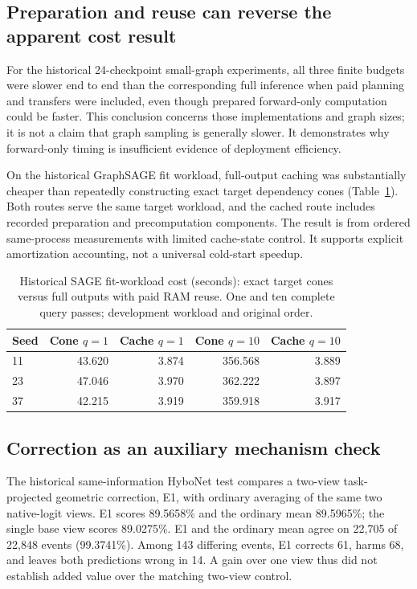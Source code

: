 \subsection{Preparation and reuse can reverse the apparent cost result}
For the historical 24-checkpoint small-graph experiments, all three finite budgets were slower end to end than the corresponding full inference when paid planning and transfers were included, even though prepared forward-only computation could be faster. This conclusion concerns those implementations and graph sizes; it is not a claim that graph sampling is generally slower. It demonstrates why forward-only timing is insufficient evidence of deployment efficiency.

On the historical GraphSAGE fit workload, full-output caching was substantially cheaper than repeatedly constructing exact target dependency cones (Table~\ref{tab:cache}). Both routes serve the same target workload, and the cached route includes recorded preparation and precomputation components. The result is from ordered same-process measurements with limited cache-state control. It supports explicit amortization accounting, not a universal cold-start speedup.

\begin{table}[t]
\caption{Historical SAGE fit-workload cost (seconds): exact target cones versus full outputs with paid RAM reuse. One and ten complete query passes; development workload and original order.}
\label{tab:cache}
\centering
\begin{tabular}{lrrrr}
\toprule
Seed & Cone $q{=}1$ & Cache $q{=}1$ & Cone $q{=}10$ & Cache $q{=}10$\\
\midrule
11 & 43.620 & 3.874 & 356.568 & 3.889\\
23 & 47.046 & 3.970 & 362.222 & 3.897\\
37 & 42.215 & 3.919 & 359.918 & 3.917\\
\bottomrule
\end{tabular}
\end{table}

\subsection{Correction as an auxiliary mechanism check}
The historical same-information HyboNet test compares a two-view task-projected geometric correction, E1, with ordinary averaging of the same two native-logit views. E1 scores 89.5658\% and the ordinary mean 89.5965\%; the single base view scores 89.0275\%. E1 and the ordinary mean agree on 22,705 of 22,848 events (99.3741\%). Among 143 differing events, E1 corrects 61, harms 68, and leaves both predictions wrong in 14. A gain over one view thus did not establish added value over the matching two-view control.

